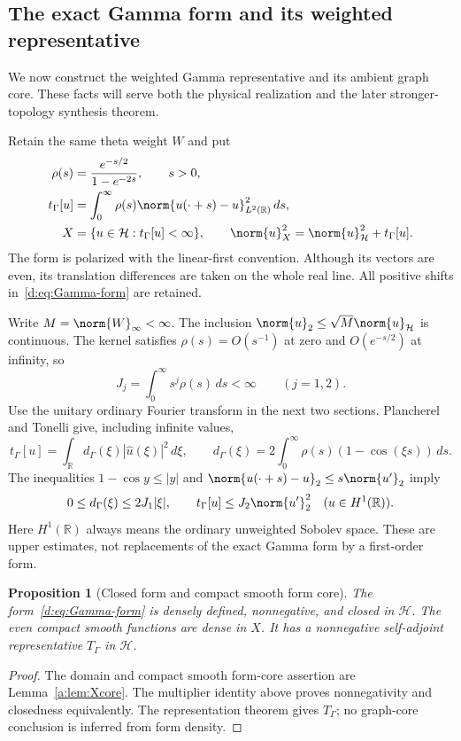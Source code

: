 \documentclass[11pt,a4paper]{article}
\numberwithin{equation}{section}
\newtheorem{proposition}[theorem]{Proposition}
\theoremstyle{definition}\newtheorem{definition}[theorem]{Definition}
\theoremstyle{remark}\newtheorem{remark}[theorem]{Remark}
\newcommand{\R}{\mathbb R}\newcommand{\C}{\mathbb C}\newcommand{\N}{\mathbb N}
\newcommand{\Hh}{\mathcal H}\newcommand{\Hw}{\mathcal H}
\newcommand{\tg}{t_\Gamma}\newcommand{\cg}{c_\Gamma}
\begin{document}
\subsection{The exact Gamma form and its weighted representative}\label{d:sec:Gamma-form}

We now construct the weighted Gamma representative and its ambient graph core. These facts will serve both the physical realization and the later stronger-topology synthesis theorem.

Retain the same theta weight $W$ and put
\begin{align}
 \rho(s)&=\frac{e^{-s/2}}{1-e^{-2s}},\qquad s>0,\label{d:eq:Gamma-rho}\\
 \tg[u]&=\int_0^\infty\rho(s)
       \norm{u(\cdot+s)-u}_{L^2(\R)}^2\,ds,\label{d:eq:Gamma-form}\\
 {X}&=\{u\in\Hh:\tg[u]<\infty\},\qquad
 \norm{u}_{{X}}^2=\norm{u}_{\Hh}^2+\tg[u].
 \label{d:eq:Gamma-X}
\end{align}
The form is polarized with the linear-first convention. Although its vectors are even, its translation differences are taken on the whole real line. All positive shifts in~\eqref{d:eq:Gamma-form} are retained.

Write $M=\norm{W}_\infty<\infty$. The inclusion
$\norm{u}_2\le\sqrt M\norm{u}_{\Hh}$ is continuous. The kernel satisfies $\rho(s)=O(s^{-1})$ at zero and $O(e^{-s/2})$ at infinity, so
\begin{equation}\label{d:eq:Gamma-J}
 J_j=\int_0^\infty s^j\rho(s)\,ds<\infty\qquad(j=1,2).
\end{equation}
Use the unitary ordinary Fourier transform in the next two sections. Plancherel and Tonelli give, including infinite values,
\begin{equation}\label{d:eq:Gamma-multiplier}
 \tg[u]=\int_\R d_\Gamma(\xi)|\widehat u(\xi)|^2\,d\xi,
 \qquad d_\Gamma(\xi)=2\int_0^\infty\rho(s)(1-\cos(\xi s))\,ds.
\end{equation}
The inequalities $1-\cos y\le |y|$ and
$\norm{u(\cdot+s)-u}_2\le s\norm{u'}_2$ imply
\begin{equation}\label{d:eq:Gamma-first-order}
 0\le d_\Gamma(\xi)\le2J_1|\xi|,\qquad
 \tg[u]\le J_2\norm{u'}_2^2
 \quad(u\in H^1(\R)).
\end{equation}
Here $H^1(\R)$ always means the ordinary unweighted Sobolev space. These are upper estimates, not replacements of the exact Gamma form by a first-order form.

\begin{proposition}[Closed form and compact smooth form core]\label{d:prop:Gamma-form-core}
The form~\eqref{d:eq:Gamma-form} is densely defined, nonnegative, and closed in $\Hh$. The even compact smooth functions are dense in ${X}$. It has a nonnegative self-adjoint representative $T_\Gamma$ in $\Hh$.
\end{proposition}
\begin{proof}
The domain and compact smooth form-core assertion are Lemma~\ref{a:lem:Xcore}. The multiplier identity above proves nonnegativity and closedness equivalently. The representation theorem gives $T_\Gamma$; no graph-core conclusion is inferred from form density.
\end{proof}
\end{document}
